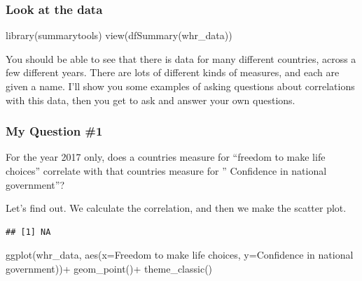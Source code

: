 \documentclass[
]{book}
\newenvironment{Shaded}{\begin{snugshade}}{\end{snugshade}}
\newcommand{\AttributeTok}[1]{\textcolor[rgb]{0.77,0.63,0.00}{#1}}
\newcommand{\FunctionTok}[1]{\textcolor[rgb]{0.00,0.00,0.00}{#1}}
\newcommand{\NormalTok}[1]{#1}
\newcommand{\SpecialCharTok}[1]{\textcolor[rgb]{0.00,0.00,0.00}{#1}}
\newcommand{\StringTok}[1]{\textcolor[rgb]{0.31,0.60,0.02}{#1}}
\begin{document}
\hypertarget{look-at-the-data-1}{%
\subsubsection{Look at the data}\label{look-at-the-data-1}}

\begin{Shaded}
\begin{Highlighting}[]
\FunctionTok{library}\NormalTok{(summarytools)}
\FunctionTok{view}\NormalTok{(}\FunctionTok{dfSummary}\NormalTok{(whr\_data))}
\end{Highlighting}
\end{Shaded}

You should be able to see that there is data for many different countries, across a few different years. There are lots of different kinds of measures, and each are given a name. I'll show you some examples of asking questions about correlations with this data, then you get to ask and answer your own questions.

\hypertarget{my-question-1}{%
\subsubsection{My Question \#1}\label{my-question-1}}

For the year 2017 only, does a countries measure for ``freedom to make life choices'' correlate with that countries measure for '' Confidence in national government''?

Let's find out. We calculate the correlation, and then we make the scatter plot.

\begin{Shaded}
\end{Shaded}

\begin{verbatim}
## [1] NA
\end{verbatim}

\begin{Shaded}
\begin{Highlighting}[]
\FunctionTok{ggplot}\NormalTok{(whr\_data, }\FunctionTok{aes}\NormalTok{(}\AttributeTok{x=}\StringTok{\textasciigrave{}}\AttributeTok{Freedom to make life choices}\StringTok{\textasciigrave{}}\NormalTok{,}
                     \AttributeTok{y=}\StringTok{\textasciigrave{}}\AttributeTok{Confidence in national government}\StringTok{\textasciigrave{}}\NormalTok{))}\SpecialCharTok{+}
  \FunctionTok{geom\_point}\NormalTok{()}\SpecialCharTok{+}
  \FunctionTok{theme\_classic}\NormalTok{()}
\end{Highlighting}
\end{Shaded}
\end{document}
